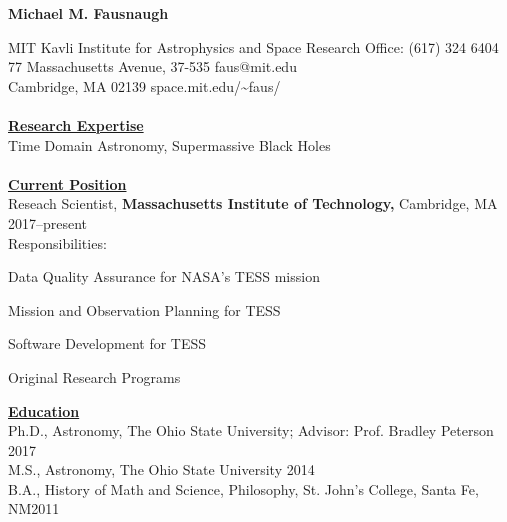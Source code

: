 \documentclass[letterpaper,12pt]{article}
\begin{document}
\begin{center}
\huge\bfseries{Michael M. Fausnaugh}
\end{center}

\noindent MIT Kavli Institute for Astrophysics and Space Research \hfill Office: (617) 324 6404 \\
77 Massachusetts Avenue, 37-535  \hfill faus@mit.edu\\
Cambridge, MA 02139 \hfill space.mit.edu/\textasciitilde faus/
\\
\\
\underline{\textbf{Research Expertise}}\\
Time Domain Astronomy, Supermassive Black Holes
\\
\\
\underline{\textbf{Current Position}} \\
Reseach Scientist, \textbf{Massachusetts Institute of Technology,} Cambridge, MA \hfill 2017--present\\
Responsibilities: \begin{compactitem}
   \item Data Quality Assurance for NASA's TESS mission
   \item Mission and Observation Planning for TESS
   \item Software Development for TESS
   \item Original Research Programs
   \end{compactitem}	
\underline{\textbf{Education}}    \\
Ph.D., Astronomy, The Ohio State University;  Advisor:  Prof. Bradley Peterson \hfill 2017\\
M.S.,  Astronomy, The Ohio State University \hfill 2014\\
B.A., History of Math and Science, Philosophy, St. John's College, Santa Fe, NM\hfill 2011\\
\end{document}
